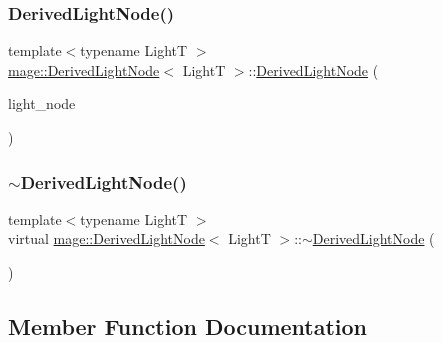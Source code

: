 \subsubsection{\texorpdfstring{Derived\+Light\+Node()}{DerivedLightNode()}\hspace{0.1cm}{\footnotesize\ttfamily [4/4]}}
{\footnotesize\ttfamily template$<$typename LightT $>$ \\
\hyperlink{classmage_1_1_derived_light_node}{mage\+::\+Derived\+Light\+Node}$<$ LightT $>$\+::\hyperlink{classmage_1_1_derived_light_node}{Derived\+Light\+Node} (\begin{DoxyParamCaption}\item[{\hyperlink{classmage_1_1_derived_light_node}{Derived\+Light\+Node}$<$ LightT $>$ \&\&}]{light\+\_\+node }\end{DoxyParamCaption})}

\hypertarget{classmage_1_1_derived_light_node_ad4b2371e323d30eda05744237d4dc4eb}{}\label{classmage_1_1_derived_light_node_ad4b2371e323d30eda05744237d4dc4eb} 
\subsubsection{\texorpdfstring{$\sim$\+Derived\+Light\+Node()}{~DerivedLightNode()}}
{\footnotesize\ttfamily template$<$typename LightT $>$ \\
virtual \hyperlink{classmage_1_1_derived_light_node}{mage\+::\+Derived\+Light\+Node}$<$ LightT $>$\+::$\sim$\hyperlink{classmage_1_1_derived_light_node}{Derived\+Light\+Node} (\begin{DoxyParamCaption}{ }\end{DoxyParamCaption})\hspace{0.3cm}{\ttfamily [virtual]}}



\subsection{Member Function Documentation}
\hypertarget{classmage_1_1_derived_light_node_a38fcbc8d5204f92d0dfd87c1c6d10281}{}\label{classmage_1_1_derived_light_node_a38fcbc8d5204f92d0dfd87c1c6d10281} 
